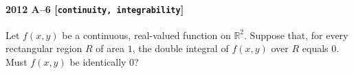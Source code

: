 \paragraph{2012 A--6 \textnormal{[\texttt{continuity, integrability}]}}
Let $f(x,y)$ be a continuous, real-valued function on $\mathbb{R}^2$. Suppose that, for every
rectangular region $R$ of area $1$, the double integral of $f(x,y)$ over $R$ equals $0$.
Must $f(x,y)$ be identically 0?
